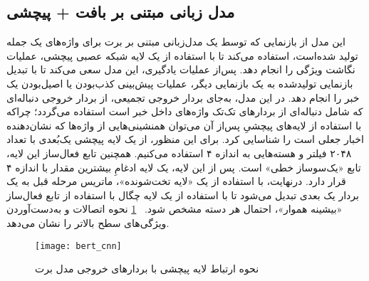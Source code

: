 \subsection{مدل زبانی مبتنی بر بافت + پیچشی}
این مدل از بازنمایی که توسط یک مدل‌زبانی مبتنی بر برت برای واژه‌های یک جمله تولید شده‌است، استفاده می‌کند تا با استفاده از یک لایه شبکه عصبی پیچشی، عملیات نگاشت ویژگی را انجام دهد. پس‌از عملیات یادگیری، این مدل سعی می‌کند تا با تبدیل بازنمایی تولیدشده به یک بازنمایی دیگر، عملیات پیش‌بینی کذب‌بودن یا اصیل‌بودن یک خبر را انجام دهد. در این مدل، به‌جای بردار خروجی تجمیعی، از بردار خروجی دنباله‌ای که شامل دنباله‌ای از بردارهای تک‌تک واژه‌های داخل خبر است استفاده می‌گردد؛ چراکه با استفاده از لایه‌های پیچشیِ پس‌از آن می‌توان همنشینی‌هایی از واژه‌ها که نشان‌دهنده اخبار جعلی است را شناسایی کرد. برای این منظور، از یک لایه پیچشی یک‌بُعدی با تعداد ۲۰۴۸ فیلتر و هسته‌هایی به اندازه ۴ استفاده می‌کنیم. همچنین تابع فعال‌ساز این لایه، تابع «یک‌سوساز خطی» است. پس از این لایه، یک لایه ادغامِ بیشترین مقدار با اندازه ۴ قرار دارد. درنهایت، با استفاده از یک «لایه تخت‌شونده»، ماتریس مرحله قبل به یک بردار یک بعدی تبدیل می‌شود تا با استفاده از یک لایه چگال با استفاده از تابع فعال‌ساز «بیشینه هموار»، احتمال هر دسته مشخص شود. \figurename~\ref{fig.bertCNN} نحوه اتصالات و به‌دست‌آوردن ویژگی‌های سطح بالاتر را نشان می‌دهد.

\begin{figure}[!h]
\texttt{[image: bert\_cnn]}
\centering
\caption{نحوه ارتباط لایه پیچشی با بردارهای خروجی مدل برت}
\label{fig.bertCNN}
\end{figure}
